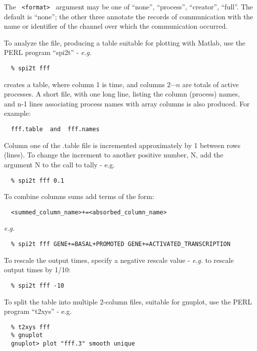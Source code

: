 \noindent
The \verb+ <format> + argument may be one of ``none'', ``process'',
``creator'', ``full''.  The default is ``none''; the other three
annotate the records of communication with the name or identifier
of the channel over which the communication occurred.

\noindent
To analyze the file, producing a table suitable for plotting with
Matlab, use the PERL program ``spi2t'' - {\em e.g.}

\begin{verbatim}
  % spi2t fff
\end{verbatim}

creates a table, where column 1 is time, and columns $2 \cdots n$ are totals
of active processes.  A short file, with one long line, listing the
column (process) names, and n-1 lines associating process names with
array columns is also produced.  For example:

\begin{verbatim}
  fff.table  and  fff.names
\end{verbatim}

\noindent
Column one of the .table file is incremented approximately by 1 between
rows (lines).  To change the increment to another positive number, N,
add the argument N to the call to tally - e.g.

\begin{verbatim}
  % spi2t fff 0.1
\end{verbatim}

\noindent
To combine columns sums add terms of the form:

\begin{verbatim}
  <summed_column_name>+=<absorbed_column_name>
\end{verbatim}
{\em e.g.}
\begin{verbatim}
  % spi2t fff GENE+=BASAL+PROMOTED GENE+=ACTIVATED_TRANSCRIPTION
\end{verbatim}

\noindent
To rescale the output times, specify a negative rescale value - {\em e.g.}
to rescale output times by 1/10:
\begin{verbatim}
  % spi2t fff -10
\end{verbatim}

\noindent
To split the table into multiple 2-column files, suitable for gnuplot,
use the PERL program ``t2xys'' - e.g.

\begin{verbatim}
  % t2xys fff
  % gnuplot
  gnuplot> plot "fff.3" smooth unique
\end{verbatim}

